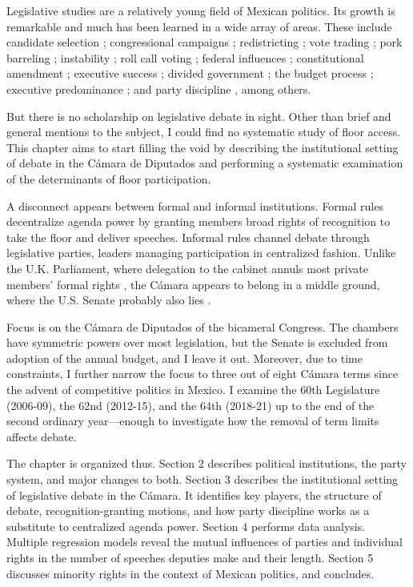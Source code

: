\documentclass[letter,12pt]{article}
\begin{document}
Legislative studies are a relatively young field of Mexican politics. Its growth is remarkable and much has been learned in a wide array of areas. These include candidate selection \citep{ascencio.kerevel.cand-sel-beh.2021}; congressional campaigns \citep{langston.nd}; redistricting \citep{magar.altman.mcd.trelles2016pg}; vote trading \citep{lopez.lara.aldf2013}; pork barreling \citep{kerevelPork2015}; instability \citep{heller.weldon.2003}; roll call voting \citep{cantuDesposatoMagar.MxRcv.2014}; federal influences \citep{rosas.langston.2011}; constitutional amendment \citep{casar.marvan2014book}; executive success \citep{bejarQuienLegisla2012}; divided government \citep{casarSinMay2013}; the budget process \citep{weldon.2002}; executive predominance \citep{weldon.1997}; and party discipline \citep{tellez-del-rio.2018}, among others.

But there is no scholarship on legislative debate in sight. Other than brief and general mentions to the subject, I could find no systematic study of floor access. This chapter aims to start filling the void by describing the institutional setting of debate in the Cámara de Diputados and performing a systematic examination of the determinants of floor participation.

A disconnect appears between formal and informal institutions. Formal rules decentralize agenda power by granting members broad rights of recognition to take the floor and deliver speeches. Informal rules channel debate through legislative parties, leaders managing participation in centralized fashion. Unlike the U.K. Parliament, where delegation to the cabinet annuls most private members' formal rights \citep{cox.1987}, the Cámara appears to belong in a middle ground, where the U.S. Senate probably also lies \citep{denhartog.monroe.SenateBook.2011}.

Focus is on the Cámara de Diputados of the bicameral Congress. The chambers have symmetric powers over most legislation, but the Senate is excluded from adoption of the annual budget, and I leave it out. Moreover, due to time constraints, I further narrow the focus to three out of eight Cámara terms since the advent of competitive politics in Mexico. I examine the 60th Legislature (2006-09), the 62nd (2012-15), and the 64th (2018-21) up to the end of the second ordinary year---enough to investigate how the removal of term limits affects debate.

The chapter is organized thus. Section 2 describes political institutions, the party system, and major changes to both. Section 3 describes the institutional setting of legislative debate in the Cámara. It identifies key players, the structure of debate, recognition-granting motions, and how party discipline works as a substitute to centralized agenda power. Section 4 performs data analysis. Multiple regression models reveal the mutual influences of parties and individual rights in the number of speeches deputies make and their length. Section 5 discusses minority rights in the context of Mexican politics, and concludes. 
\end{document}
